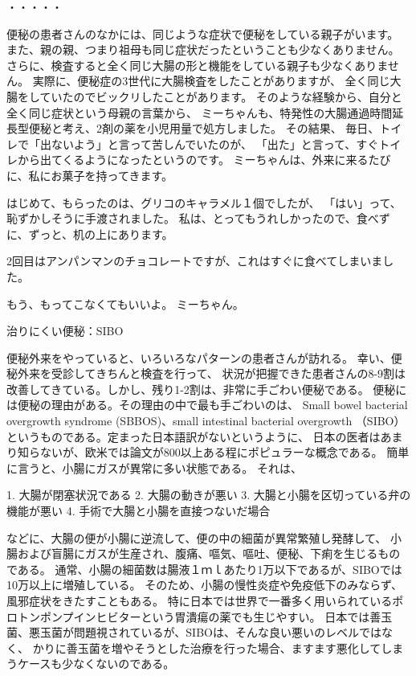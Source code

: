・・・・・

便秘の患者さんのなかには、同じような症状で便秘をしている親子がいます。
また、親の親、つまり祖母も同じ症状だったということも少なくありません。
さらに、検査すると全く同じ大腸の形と機能をしている親子も少なくありません。
実際に、便秘症の3世代に大腸検査をしたことがありますが、
全く同じ大腸をしていたのでビックリしたことがあります。
そのような経験から、自分と全く同じ症状という母親の言葉から、
ミーちゃんも、特発性の大腸通過時間延長型便秘と考え、2剤の薬を小児用量で処方しました。
その結果、
毎日、トイレで「出ないよう」と言って苦しんでいたのが、
「出た」と言って、すぐトイレから出てくるようになったというのです。
ミーちゃんは、外来に来るたびに、私にお菓子を持ってきます。



はじめて、もらったのは、グリコのキャラメル１個でしたが、
「はい」って、恥ずかしそうに手渡されました。
私は、とってもうれしかったので、食べずに、ずっと、机の上にあります。


2回目はアンパンマンのチョコレートですが、これはすぐに食べてしまいました。

もう、もってこなくてもいいよ。
ミーちゃん。


治りにくい便秘：SIBO 



便秘外来をやっていると、いろいろなパターンの患者さんが訪れる。 
幸い、便秘外来を受診してきちんと検査を行って、
状況が把握できた患者さんの8-9割は改善してきている。しかし、残り1-2割は、非常に手ごわい便秘である。 
便秘には便秘の理由がある。その理由の中で最も手ごわいのは、 
Small bowel bacterial overgrowth syndrome (SBBOS)、small intestinal bacterial overgrowth （SIBO）
というものである。定まった日本語訳がないというように、
日本の医者はあまり知らないが、欧米では論文が800以上ある程にポピュラーな概念である。 
簡単に言うと、小腸にガスが異常に多い状態である。 
それは、 

  1. 大腸が閉塞状況である 
  2. 大腸の動きが悪い 
  3. 大腸と小腸を区切っている弁の機能が悪い 
  4. 手術で大腸と小腸を直接つないだ場合 

などに、大腸の便が小腸に逆流して、便の中の細菌が異常繁殖し発酵して、
小腸および盲腸にガスが生産され、腹痛、嘔気、嘔吐、便秘、下痢を生じるものである。
通常、小腸の細菌数は腸液１ｍｌあたり1万以下であるが、SIBOでは10万以上に増殖している。
そのため、小腸の慢性炎症や免疫低下のみならず、風邪症状をきたすこともある。
特に日本では世界で一番多く用いられているポロトンポンプインヒビターという胃潰瘍の薬でも生じやすい。 
日本では善玉菌、悪玉菌が問題視されているが、SIBOは、そんな良い悪いのレベルではなく、
かりに善玉菌を増やそうとした治療を行った場合、ますます悪化してしまうケースも少なくないのである。 

